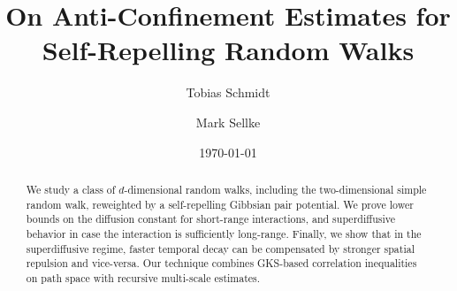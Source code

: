 \documentclass[reqno,11pt]{amsart}
\title{On Anti-Confinement Estimates for Self-Repelling Random Walks}
\author{Tobias Schmidt}
\author{Mark Sellke}
\date{\today}
\newcommand{\1}{\mathds{1}}
\theoremstyle{plain}
\theoremstyle{definition}
\numberwithin{equation}{section}
\begin{document}
\maketitle

\begin{abstract}
    We study a class of $d$-dimensional random walks, including the two-dimensional simple random walk, reweighted by a self-repelling Gibbsian pair potential. We prove lower bounds on the diffusion
    constant for short-range interactions, and superdiffusive behavior in case the
    interaction is sufficiently long-range. Finally, we show that in the superdiffusive regime, faster temporal decay can be compensated by stronger spatial repulsion and vice-versa.
    Our technique combines GKS-based correlation inequalities on path space with recursive multi-scale estimates.
\end{abstract}
\end{document}
